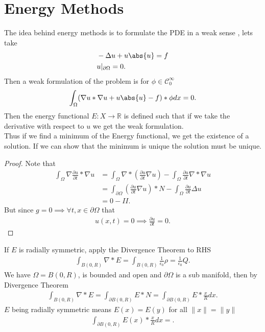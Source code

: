 \section{Energy Methods}
The idea behind energy methods is to formulate the PDE in a weak sense , lets take 
\begin{align*}
  &- \Delta u + u \abs{u} = f\\
  &u\rvert_{\partial \Omega }  = 0 
.\end{align*}
Then a weak formulation of the problem is for $\phi \in  \mathcal{C}_0^{\infty} $
\begin{align*}
  \int_\Omega  (\nabla u * \nabla u + u \abs{u} - f) * \phi dx = 0
.\end{align*}
Then the energy functional $E : X \to \mathbb{R}$ is defined such that if we take the derivative with respect to $u$ 
we get the weak formulation.\\
Thus if we find a minimum of the Energy functional, we get the existence of a solution. If we can show that the minimum is unique the solution must be unique.
\begin{Theorem}[5.4.]
  
\end{Theorem}
\begin{proof}
 Note that 
 \begin{align*}
   \int_\Omega  \nabla \frac{\partial u}{\partial t}  * \nabla u &=  \int_{\Omega } \nabla * (\frac{\partial u}{\partial t} \nabla u) - \int_{\Omega } \frac{\partial u}{\partial t} \nabla*\nabla u\\
                                                                 &= \int_{\partial \Omega } (\frac{\partial u}{\partial t} \nabla u)*N  -  \int_{\Omega } \frac{\partial u}{\partial t} \Delta u\\
                                                                 &= 0 - II
 .\end{align*}
 But since $g = 0 \implies \forall t , x \in  \partial \Omega $ that
 \begin{align*}
  u(x,t) = 0 \implies \frac{\partial u}{\partial t}  = 0
 .\end{align*}
\end{proof}
\newpage
\begin{exercise}
  If $E$ is radially symmetric, apply the Divergence Theorem to RHS
  \begin{align*}
  \int_{B(0,R)} \nabla * E =  \int_{B(0,R)} \frac{1}{\epsilon_0} \rho  = \frac{1}{\epsilon_0} Q
.\end{align*}
We have $\Omega  = B(0,R)$, is bounded and open and $\partial \Omega $ is a sub manifold, then by Divergence Theorem
\begin{align*}
  \int_{B(0,R)} \nabla * E =  \int_{\partial B(0,R)}  E*N = \int_{\partial B(0,R)} E*\frac{x}{R} dx  
.\end{align*}
$E$ being radially symmetric  means $E(x) = E(y)$ for all $\|x\| = \|y\|$
\begin{align*}
  \int_{\partial B(0,R)} E(x)*\frac{x}{R} dx  = 
.\end{align*}
\end{exercise}
